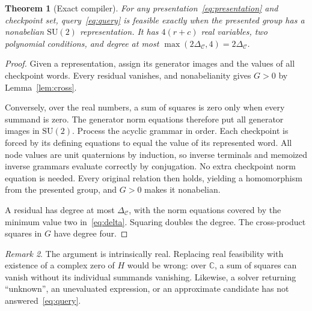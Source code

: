 \documentclass[11pt]{article}
\newtheorem{theorem}{Theorem}[section]
\theoremstyle{definition}
\theoremstyle{remark}
\newtheorem{remark}[theorem]{Remark}
\newcommand{\SU}{\mathrm{SU}(2)}
\newcommand{\calC}{\mathcal C}
\begin{document}
\begin{theorem}[Exact compiler]
\label{thm:compiler}
For any presentation~\eqref{eq:presentation} and checkpoint set, query~\eqref{eq:query} is feasible exactly when the presented group has a nonabelian $\SU$ representation. It has $4(r+c)$ real variables, two polynomial conditions, and degree at most $\max(2\Delta_{\calC},4)=2\Delta_{\calC}$.
\end{theorem}
\begin{proof}
Given a representation, assign its generator images and the values of all checkpoint words. Every residual vanishes, and nonabelianity gives $G>0$ by Lemma~\ref{lem:cross}.

Conversely, over the real numbers, a sum of squares is zero only when every summand is zero. The generator norm equations therefore put all generator images in $\SU$. Process the acyclic grammar in order. Each checkpoint is forced by its defining equations to equal the value of its represented word. All node values are unit quaternions by induction, so inverse terminals and memoized inverse grammars evaluate correctly by conjugation. No extra checkpoint norm equation is needed. Every original relation then holds, yielding a homomorphism from the presented group, and $G>0$ makes it nonabelian.

A residual has degree at most $\Delta_{\calC}$, with the norm equations covered by the minimum value two in~\eqref{eq:delta}. Squaring doubles the degree. The cross-product squares in $G$ have degree four.
\end{proof}

\begin{remark}
The argument is intrinsically real. Replacing real feasibility with existence of a complex zero of $H$ would be wrong: over $\mathbb C$, a sum of squares can vanish without its individual summands vanishing. Likewise, a solver returning ``unknown'', an unevaluated expression, or an approximate candidate has not answered~\eqref{eq:query}.
\end{remark}
\end{document}
